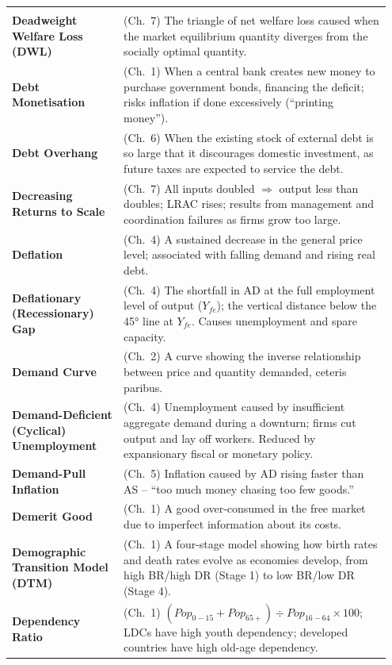 \documentclass[11pt, a4paper, twoside]{book}
\begin{document}
\begin{longtable}{@{}>{\RaggedRight\arraybackslash}p{0.28\linewidth}>{\RaggedRight\arraybackslash}p{0.67\linewidth}@{}}
\multicolumn{2}{@{}l}{\textbf{\Large\color{CurveNavy} D}} \\[2pt]
\textbf{Deadweight Welfare Loss (DWL)} & (Ch.~7) The triangle of net welfare loss caused when the market equilibrium quantity diverges from the socially optimal quantity. \\
\textbf{Debt Monetisation} & (Ch.~1) When a central bank creates new money to purchase government bonds, financing the deficit; risks inflation if done excessively (``printing money''). \\
\textbf{Debt Overhang} & (Ch.~6) When the existing stock of external debt is so large that it discourages domestic investment, as future taxes are expected to service the debt. \\
\textbf{Decreasing Returns to Scale} & (Ch.~7) All inputs doubled $\Rightarrow$ output less than doubles; LRAC rises; results from management and coordination failures as firms grow too large. \\
\textbf{Deflation} & (Ch.~4) A sustained decrease in the general price level; associated with falling demand and rising real debt. \\
\textbf{Deflationary (Recessionary) Gap} & (Ch.~4) The shortfall in AD at the full employment level of output ($Y_{fe}$); the vertical distance below the 45° line at $Y_{fe}$. Causes unemployment and spare capacity. \\
\textbf{Demand Curve} & (Ch.~2) A curve showing the inverse relationship between price and quantity demanded, ceteris paribus. \\
\textbf{Demand-Deficient (Cyclical) Unemployment} & (Ch.~4) Unemployment caused by insufficient aggregate demand during a downturn; firms cut output and lay off workers. Reduced by expansionary fiscal or monetary policy. \\
\textbf{Demand-Pull Inflation} & (Ch.~5) Inflation caused by AD rising faster than AS -- ``too much money chasing too few goods.'' \\
\textbf{Demerit Good} & (Ch.~1) A good over-consumed in the free market due to imperfect information about its costs. \\
\textbf{Demographic Transition Model (DTM)} & (Ch.~1) A four-stage model showing how birth rates and death rates evolve as economies develop, from high BR/high DR (Stage 1) to low BR/low DR (Stage 4). \\
\textbf{Dependency Ratio} & (Ch.~1) $(Pop_{0-15} + Pop_{65+}) \div Pop_{16-64} \times 100$; LDCs have high youth dependency; developed countries have high old-age dependency. \\

\end{longtable}
\end{document}
